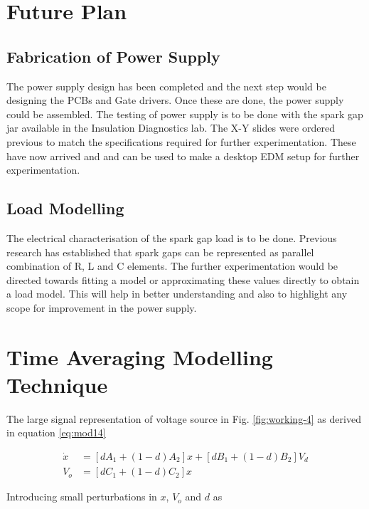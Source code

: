 \documentclass[a4paper]{IEEEtran}
\begin{document}
\section{Future Plan}
\subsection{Fabrication of Power Supply}
	The power supply design has been completed and the next step would be designing the PCBs and Gate drivers. Once these are done, the power supply could be assembled. The testing of power supply is to be done with the spark gap jar available in the Insulation Diagnostics lab. The X-Y slides were ordered previous to match the specifications required for further experimentation. These have now arrived and and can be used to make a desktop EDM setup for further experimentation.

\subsection{Load Modelling}
	The electrical characterisation of the spark gap load is to be done. Previous research has established that spark gaps can be represented as parallel combination of R, L and C elements. The further experimentation would be directed towards fitting a model or approximating these values directly to obtain a load model. This will help in better understanding and also to highlight any scope for improvement in the power supply.





\appendices

\section{Time Averaging Modelling Technique}
\label{app:modelling}
	The large signal representation of voltage source in Fig. \ref{fig:working-4} as derived in equation \eqref{eq:mod14}

	\begin{equation*}
		\begin{split}
			\dot{x} &= [dA_1+(1-d)A_2]x + [dB_1 + (1-d)B_2]V_d\\
			V_o &= [dC_1+(1-d)C_2]x
		\end{split}
	\end{equation*}	

	Introducing small perturbations in $x$, $V_o$ and $d$ as
\end{document}
